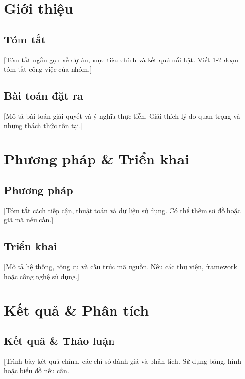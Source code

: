 \documentclass[a4paper]{book}
\begin{document}
\listoffigures %

\listoftables %

\tableofcontents
\clearpage

\chapter{Giới thiệu}

\section{Tóm tắt}
[Tóm tắt ngắn gọn về dự án, mục tiêu chính và kết quả nổi bật. Viết 1-2 đoạn tóm tắt công việc của nhóm.]

\section{Bài toán đặt ra}
[Mô tả bài toán giải quyết và ý nghĩa thực tiễn. Giải thích lý do quan trọng và những thách thức tồn tại.]

\chapter{Phương pháp \& Triển khai}

\section{Phương pháp}
[Tóm tắt cách tiếp cận, thuật toán và dữ liệu sử dụng. Có thể thêm sơ đồ hoặc giả mã nếu cần.]

\section{Triển khai}
[Mô tả hệ thống, công cụ và cấu trúc mã nguồn. Nêu các thư viện, framework hoặc công nghệ sử dụng.]

\chapter{Kết quả \& Phân tích}

\section{Kết quả \& Thảo luận}
[Trình bày kết quả chính, các chỉ số đánh giá và phân tích. Sử dụng bảng, hình hoặc biểu đồ nếu cần.]
\end{document}
